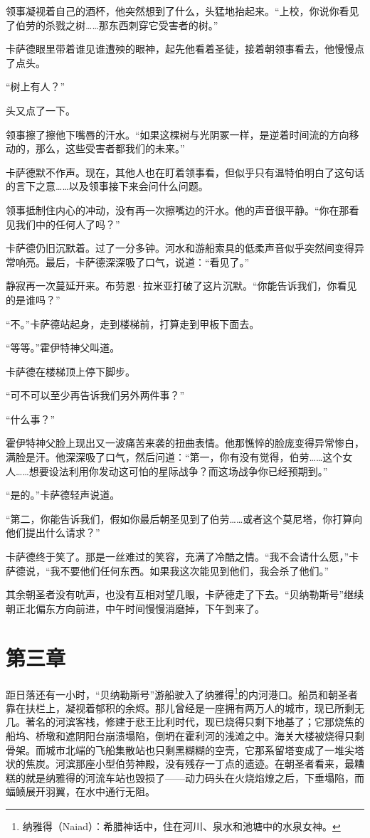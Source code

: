 \documentclass[AutoFakeBold=true]{book}
\begin{document}
领事凝视着自己的酒杯，他突然想到了什么，头猛地抬起来。``上校，你说你看见了伯劳的杀戮之树……那东西刺穿它受害者的树。''

卡萨德眼里带着谁见谁遭殃的眼神，起先他看着圣徒，接着朝领事看去，他慢慢点了点头。

``树上有人？''

头又点了一下。

领事擦了擦他下嘴唇的汗水。``如果这棵树与光阴冢一样，是逆着时间流的方向移动的，那么，这些受害者都我们的未来。''

卡萨德默不作声。现在，其他人也在盯着领事看，但似乎只有温特伯明白了这句话的言下之意……以及领事接下来会问什么问题。

领事抵制住内心的冲动，没有再一次擦嘴边的汗水。他的声音很平静。``你在那看见我们中的任何人了吗？''

卡萨德仍旧沉默着。过了一分多钟。河水和游船索具的低柔声音似乎突然间变得异常响亮。最后，卡萨德深深吸了口气，说道：``看见了。''

静寂再一次蔓延开来。布劳恩·拉米亚打破了这片沉默。``你能告诉我们，你看见的是谁吗？''

``不。''卡萨德站起身，走到楼梯前，打算走到甲板下面去。

``等等。''霍伊特神父叫道。

卡萨德在楼梯顶上停下脚步。

``可不可以至少再告诉我们另外两件事？''

``什么事？''

霍伊特神父脸上现出又一波痛苦来袭的扭曲表情。他那憔悴的脸庞变得异常惨白，满脸是汗。他深深吸了口气，然后问道：``第一，你有没有觉得，伯劳……这个女人……想要设法利用你发动这可怕的星际战争？而这场战争你已经预期到。''

``是的。''卡萨德轻声说道。

``第二，你能告诉我们，假如你最后朝圣见到了伯劳……或者这个莫尼塔，你打算向他们提出什么请求？''

卡萨德终于笑了。那是一丝难过的笑容，充满了冷酷之情。``我不会请什么愿，''卡萨德说，``我不要他们任何东西。如果我这次能见到他们，我会杀了他们。''

其余朝圣者没有吭声，也没有互相对望几眼，卡萨德走了下去。``贝纳勒斯号''继续朝正北偏东方向前进，中午时间慢慢消磨掉，下午到来了。

\chapter{第三章}

距日落还有一小时，``贝纳勒斯号''游船驶入了纳雅得\footnote{纳雅得（Naiad）：希腊神话中，住在河川、泉水和池塘中的水泉女神。}的内河港口。船员和朝圣者靠在扶栏上，凝视着郁积的余烬。那儿曾经是一座拥有两万人的城市，现已所剩无几。著名的河滨客栈，修建于悲王比利时代，现已烧得只剩下地基了；它那烧焦的船坞、桥墩和遮阴阳台崩溃塌陷，倒坍在霍利河的浅滩之中。海关大楼被烧得只剩骨架。而城市北端的飞船集散站也只剩黑糊糊的空壳，它那系留塔变成了一堆尖塔状的焦炭。河滨那座小型伯劳神殿，没有残存一丁点的遗迹。在朝圣者看来，最糟糕的就是纳雅得的河流车站也毁损了——动力码头在火烧焰燎之后，下垂塌陷，而蝠鲼展开羽翼，在水中通行无阻。
\end{document}
